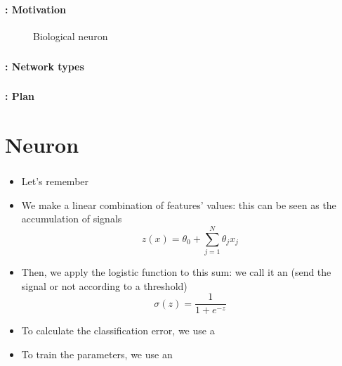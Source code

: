 \documentclass[xcolor=table]{beamer}
\subtitle[Neural Networks]{Neural Networks}
\begin{document}
\begin{frame}
	\frametitle{\inserttitle}
	\framesubtitle{\insertshortsubtitle: Motivation}

	\begin{figure}
		\centering
		\caption{Biological neuron \cite{2017-cain}}
	\end{figure}

\end{frame}

\begin{frame}
	\frametitle{\inserttitle}
	\framesubtitle{\insertshortsubtitle: Network types}
	
	
\end{frame}

\begin{frame}
	\frametitle{\inserttitle}
	\framesubtitle{\insertshortsubtitle: Plan}

	\begin{multicols}{2}
		\tableofcontents
	\end{multicols}
\end{frame}

\section{Neuron}

\begin{frame}
	\frametitle{\insertshortsubtitle}
	\framesubtitle{\insertsection}
	
	\begin{itemize}
		\item Let's remember 
		\item We make a linear combination of features' values: this can be seen as the accumulation of signals
		\[z(x) = \theta_0 + \sum\limits_{j=1}^{N} \theta_j x_j\]
		\item Then, we apply the logistic function to this sum: we call it an  (send the signal or not according to a threshold)
		\[\sigma(z) = \frac{1}{1 + e^{-z}}\]
		\item To calculate the classification error, we use a 
		\item To train the parameters, we use an 
	\end{itemize}

\end{frame}
\end{document}
